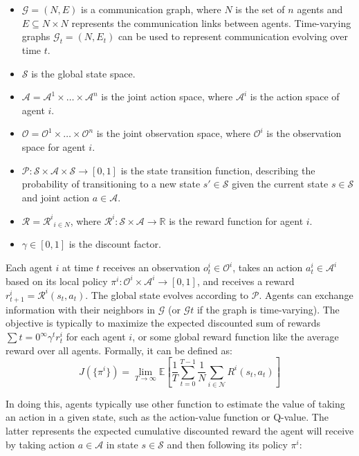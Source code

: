 \documentclass[sigconf]{acmart}
\begin{document}
\begin{itemize}
  \item $\mathcal{G} = (N, E)$ is a communication graph, where $N$ is the set of $n$ agents and $E \subseteq N \times N$ represents the communication links between agents. Time-varying graphs $\mathcal{G}_t = (N, E_t)$ can be used to represent communication evolving over time $t$.
  \item $\mathcal{S}$ is the global state space.
  \item $\mathcal{A} = \mathcal{A}^1 \times \dots \times \mathcal{A}^n$ is the joint action space, where $\mathcal{A}^i$ is the action space of agent $i$.
  \item $\mathcal{O} = \mathcal{O}^1 \times \dots \times \mathcal{O}^n$ is the joint observation space, where $\mathcal{O}^i$ is the observation space for agent $i$.
  \item $\mathcal{P}: \mathcal{S} \times \mathcal{A} \times \mathcal{S} \to [0, 1]$ is the state transition function, describing the probability of transitioning to a new state $s' \in \mathcal{S}$ given the current state $s \in \mathcal{S}$ and joint action $a \in \mathcal{A}$.
  \item $\mathcal{R} = {\mathcal{R}^i}_{i \in N}$, where $\mathcal{R}^i: \mathcal{S} \times \mathcal{A} \to \mathbb{R}$ is the reward function for agent $i$.
  \item $\gamma \in [0, 1]$ is the discount factor.
\end{itemize}
Each agent $i$ at time $t$ receives an observation $o^i_t \in \mathcal{O}^i$, 
takes an action $a^i_t \in \mathcal{A}^i$ based on its local policy $\pi^i: \mathcal{O}^i \times \mathcal{A}^i \to [0,1]$, and receives a reward $r^i_{t+1} = \mathcal{R}^i(s_t, a_t)$. 
%
The global state evolves according to $\mathcal{P}$. 
Agents can exchange information with their neighbors in $\mathcal{G}$ 
(or $\mathcal{G}t$ if the graph is time-varying). 
%
The objective is typically to maximize the expected discounted sum of rewards $\sum{t=0}^{\infty} \gamma^t r^i_t$ for each agent $i$, 
or some global reward function like the average reward over all agents.
Formally, it can be defined as:
\[ J(\{\pi^i\}) = \lim_{T \to \infty} \mathbb{E} \left[ \frac{1}{T} \sum_{t=0}^{T-1} \frac{1}{N} \sum_{i \in \mathcal{N}} R^i(s_t, a_t) \right] \]

In doing this, agents typically use other function to estimate the value of taking an action in a given state, such as the action-value function or Q-value. 
The latter represents the expected cumulative discounted reward the agent will receive by taking action $a \in \mathcal{A}$ in state $s \in \mathcal{S}$ and then following its policy $\pi^i$:
\end{document}
